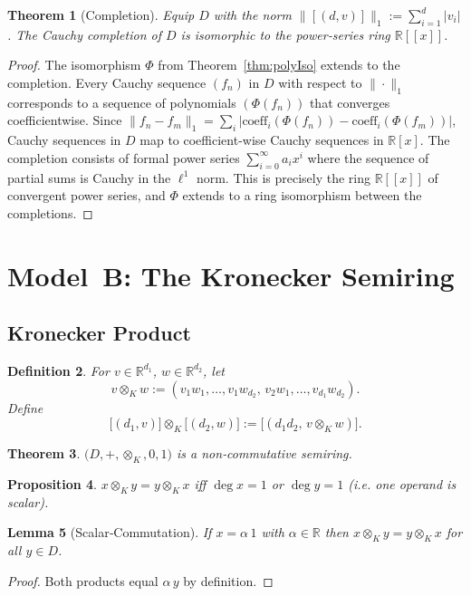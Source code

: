 \documentclass[11pt]{article}
\newtheorem{theorem}{Theorem}[section]
\newtheorem{proposition}[theorem]{Proposition}
\newtheorem{lemma}[theorem]{Lemma}
\newtheorem{definition}[theorem]{Definition}
\begin{document}
\begin{theorem}[Completion]\label{thm:completion}
Equip \(D\) with the norm \(\lVert[(d,v)]\rVert_1:=\sum_{i=1}^{d}|v_i|\).  The Cauchy completion of \(D\) is isomorphic to the power‑series ring \(\mathbb R[[x]]\).
\end{theorem}
\begin{proof}
The isomorphism $\Phi$ from Theorem~\ref{thm:polyIso} extends to the completion. Every Cauchy sequence $(f_n)$ in $D$ with respect to $\|\cdot\|_1$ corresponds to a sequence of polynomials $(\Phi(f_n))$ that converges coefficientwise. Since $\|f_n - f_m\|_1 = \sum_{i} |\text{coeff}_i(\Phi(f_n)) - \text{coeff}_i(\Phi(f_m))|$, Cauchy sequences in $D$ map to coefficient-wise Cauchy sequences in $\mathbb{R}[x]$. The completion consists of formal power series $\sum_{i=0}^{\infty} a_i x^i$ where the sequence of partial sums is Cauchy in the $\ell^1$ norm. This is precisely the ring $\mathbb{R}[[x]]$ of convergent power series, and $\Phi$ extends to a ring isomorphism between the completions.
\qedhere
\end{proof}

\section{Model B: The Kronecker Semiring}
\subsection{Kronecker Product}
\begin{definition}
For \(v\in\mathbb R^{d_1}\), \(w\in\mathbb R^{d_2}\), let
\[v\otimes_K w := (v_1w_1,\dots,v_1w_{d_2},\,v_2w_1,\dots,v_{d_1}w_{d_2}).\]
Define
\[\bigl[(d_1,v)\bigr]\otimes_K \bigl[(d_2,w)\bigr] := \bigl[(d_1d_2,\,v\otimes_K w)\bigr].\]
\end{definition}

\begin{theorem}
\(\bigl(D,+,\otimes_K,0,1\bigr)\) is a non‑commutative semiring.
\end{theorem}

\begin{proposition}\label{prop:commCase}
$x\otimes_K y = y\otimes_K x$ iff $\deg x =1$ or $\deg y =1$ (i.e. one operand is scalar).
\end{proposition}

\begin{lemma}[Scalar‑Commutation]\label{lem:scalarComm}
If $x=\alpha\,1$ with $\alpha\in\mathbb R$ then $x\otimes_K y = y\otimes_K x$ for all $y\in D$.
\end{lemma}
\begin{proof}
Both products equal $\alpha\,y$ by definition.\qedhere
\end{proof}
\end{document}

